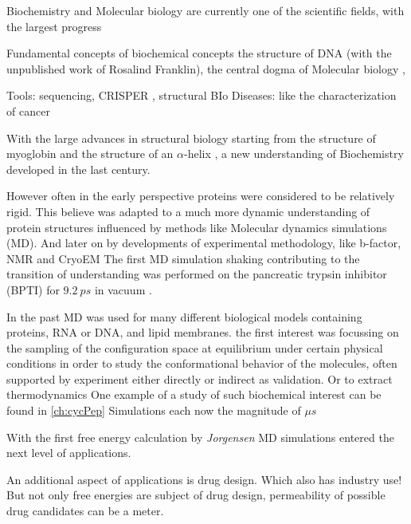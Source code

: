 
Biochemistry and Molecular biology are currently one of the scientific fields, with the largest progress

Fundamental concepts of biochemical concepts the structure of DNA \cite{Watson1953} (with the unpublished work of Rosalind Franklin), the central dogma of Molecular biology \cite{Crick1970},  

Tools: sequencing, CRISPER \cite{Deltcheva2011}, structural BIo
Diseases: like the characterization of cancer \cite{Hanahan2000, Hanahan2011} 


With the large advances in structural biology starting from the structure of myoglobin\cite{kendrew1958} and the structure of an $\alpha$-helix \cite{pauling1951}, a new understanding of Biochemistry developed in the last century. \cite{Shi2014}

However often in the early perspective proteins were considered to be relatively rigid. This believe was adapted to a much more dynamic understanding of protein structures influenced by methods like Molecular dynamics simulations (MD). \cite{Karplus2002, phillips1981} And later on by developments of experimental methodology, like b-factor, NMR and CryoEM
The first MD simulation shaking contributing to the transition of understanding was performed on the pancreatic trypsin inhibitor (BPTI) for  $9.2~ps$ in vacuum . \cite{McCammon1977} 

In the past MD was used for many different biological models containing proteins, RNA or DNA, and lipid membranes. 
the first interest was focussing on the sampling of the configuration space at equilibrium under certain physical conditions in order to study the conformational behavior of the molecules, often supported by experiment either directly or indirect as validation. Or to extract thermodynamics  One example of a study of such biochemical interest can be found in \ref{ch:cycPep}
Simulations each now the magnitude of $\mu s$

With the first free energy calculation by \textit{Jorgensen} MD simulations entered the next level of applications.

An additional aspect of applications is drug design.  \cite{Cournia2017, Cournia2020, Jorgensen1983}
Which also has industry use! \cite{Christ2014, Meier2021, Cournia2017, Cournia2020}
But not only free energies are subject of drug design, permeability of possible drug candidates can be a meter. \cite{wang, Witek2016b, Witek2017}


